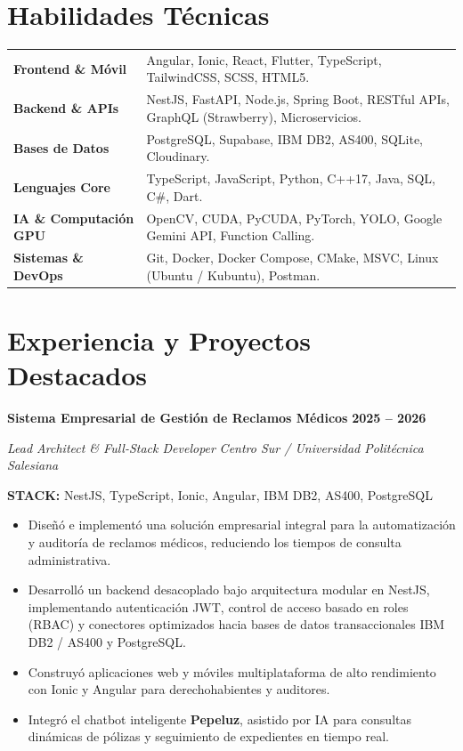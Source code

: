 \documentclass[10pt,a4paper]{article}
\newenvironment{project}[5]{
    \begin{tcolorbox}[
        enhanced,
        colback=cardbg,
        colframe=linecolor,
        boxrule=0.5pt,
        arc=2mm,
        left=3mm,
        right=3mm,
        top=2.5mm,
        bottom=2mm,
        before skip=5pt,
        after skip=5pt,
        breakable
    ]

    {\normalsize\bfseries\color{navy} #1}
    \hfill
    {\small\bfseries\color{blue} #3}

    \vspace{1pt}

    {\small\itshape\color{darktext} #2}
    \hfill
    {\small #4}

    \vspace{3pt}

    {\footnotesize\color{muted}\textbf{STACK:} #5}

    \vspace{2pt}
    \small
    \begin{itemize}
}{
    \end{itemize}
    \end{tcolorbox}
}
\newcommand{\skillrow}[2]{
    \textbf{\color{navy}#1} &
    {\small #2}\\[4pt]
}
\begin{document}
\section{Habilidades Técnicas}

\begin{tabularx}{\textwidth}{
    @{}
    >{\raggedright\arraybackslash}p{}
    X
    @{}
}
\skillrow{Frontend \& Móvil}{
    Angular, Ionic, React, Flutter, TypeScript, TailwindCSS, SCSS, HTML5.
}
\skillrow{Backend \& APIs}{
    NestJS, FastAPI, Node.js, Spring Boot, RESTful APIs, GraphQL (Strawberry), Microservicios.
}
\skillrow{Bases de Datos}{
    PostgreSQL, Supabase, IBM DB2, AS400, SQLite, Cloudinary.
}
\skillrow{Lenguajes Core}{
    TypeScript, JavaScript, Python, C++17, Java, SQL, C\#, Dart.
}
\skillrow{IA \& Computación GPU}{
    OpenCV, CUDA, PyCUDA, PyTorch, YOLO, Google Gemini API, Function Calling.
}
\skillrow{Sistemas \& DevOps}{
    Git, Docker, Docker Compose, CMake, MSVC, Linux (Ubuntu / Kubuntu), Postman.
}
\end{tabularx}

\section{Experiencia y Proyectos Destacados}

\begin{project}
{Sistema Empresarial de Gestión de Reclamos Médicos}
{Lead Architect \& Full-Stack Developer}
{2025 -- 2026}
{\textit{Centro Sur / Universidad Politécnica Salesiana}}
{NestJS, TypeScript, Ionic, Angular, IBM DB2, AS400, PostgreSQL}
    \item Diseñó e implementó una solución empresarial integral para la automatización y auditoría de reclamos médicos, reduciendo los tiempos de consulta administrativa.
    \item Desarrolló un backend desacoplado bajo arquitectura modular en NestJS, implementando autenticación JWT, control de acceso basado en roles (RBAC) y conectores optimizados hacia bases de datos transaccionales IBM DB2 / AS400 y PostgreSQL.
    \item Construyó aplicaciones web y móviles multiplataforma de alto rendimiento con Ionic y Angular para derechohabientes y auditores.
    \item Integró el chatbot inteligente \textbf{Pepeluz}, asistido por IA para consultas dinámicas de pólizas y seguimiento de expedientes en tiempo real.
\end{project}
\end{document}
